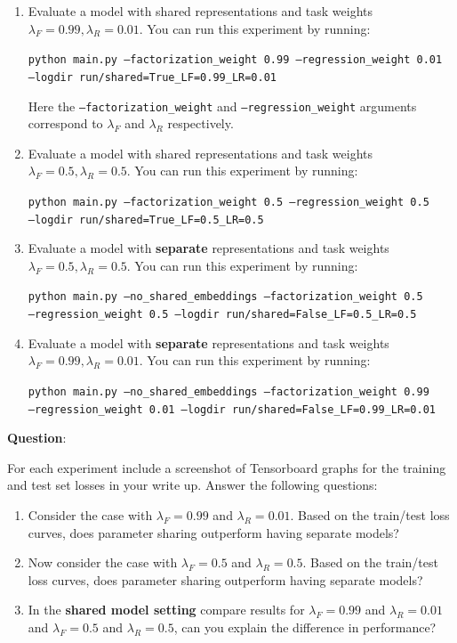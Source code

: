 \documentclass[12pt]{article}
\begin{document}
\begin{enumerate}
    \item Evaluate a model with shared representations and task weights $\lambda_F=0.99, \lambda_R=0.01$. You can run this experiment by running:
    
    \texttt{python main.py --factorization\_weight 0.99 --regression\_weight 0.01 \\--logdir run/shared=True\_LF=0.99\_LR=0.01}
    
    Here the \texttt{--factorization\_weight} and \texttt{--regression\_weight} arguments correspond to $\lambda_F$ and  $\lambda_R$ respectively.
    
    \item Evaluate a model with shared representations and task weights $\lambda_F=0.5, \lambda_R=0.5$. You can run this experiment by running:    
    
    \texttt{python main.py --factorization\_weight 0.5 --regression\_weight 0.5 \\--logdir run/shared=True\_LF=0.5\_LR=0.5}
    
    \item Evaluate a model with \textbf{separate} representations and task weights $\lambda_F=0.5, \lambda_R=0.5$. You can run this experiment by running:    
    
    \texttt{python main.py --no\_shared\_embeddings --factorization\_weight 0.5 \\ --regression\_weight 0.5 --logdir run/shared=False\_LF=0.5\_LR=0.5}
    
     \item Evaluate a model with \textbf{separate} representations and task weights $\lambda_F=0.99, \lambda_R=0.01$. You can run this experiment by running:    
    
    \texttt{python main.py --no\_shared\_embeddings --factorization\_weight 0.99 \\ --regression\_weight 0.01 --logdir run/shared=False\_LF=0.99\_LR=0.01}
    
\end{enumerate}

\noindent\textbf{Question}:


For each experiment include a screenshot of Tensorboard graphs for the training and test set losses in your write up. Answer the following questions:

\begin{enumerate}
    \item Consider the case with $\lambda_F=0.99$ and $\lambda_R=0.01$. Based on the train/test loss curves, does parameter sharing outperform having separate models? 
    
    \item Now consider the case with $\lambda_F=0.5$ and $\lambda_R=0.5$.  Based on the train/test loss curves, does parameter sharing outperform having separate models? 
    
    \item In the \textbf{shared model setting} compare results for $\lambda_F=0.99$ and $\lambda_R=0.01$ and $\lambda_F=0.5$ and $\lambda_R=0.5$, can you explain the difference in performance?
\end{enumerate}
\end{document}
